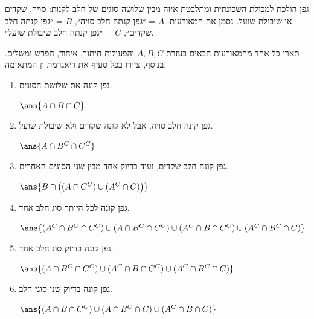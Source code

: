 גפן הולכת למכולת השכונתית ומתלבטת איזה מבין שלושה סוגים של חלב לקנות: סויה, שקדים או שיבולת שועל. נסמן את המאורעות:
$A$ = ״גפן קנתה חלב סויה״, $B$ = ״גפן קנתה חלב שקדים״, $C$ = ״גפן קנתה חלב שיבולת שועל״.

תארו כל אחד מהמאורעות הבאים בעזרת $A,B,C$ והפעולות חיתוך, איחוד, הפרש ומשלים. בנוסף, ציירו בכל סעיף את דיאגרמת ון המתאימה.
\begin{enumerate}
\item גפן קונה את שלושת הסוגים.
\begin{solbox}
$\ans{A\cap B\cap C}$

\begin{center}
\end{center}
\end{solbox}
\item גפן קונה חלב סויה, אבל לא קונה שקדים ולא שיבולת שועל.
\begin{solbox}
$\ans{A\cap B^C\cap C^C}$

\begin{center}
\end{center}
\end{solbox}
\item גפן קונה חלב שקדים, ועוד בדיוק אחד מבין שני הסוגים האחרים.
\begin{solbox}
$\ans{B\cap\big((A\cap C^C)\cup(A^C\cap C)\big)}$

\begin{center}
\end{center}
\end{solbox}
\item גפן קונה לכל היותר סוג חלב אחד.
\begin{solbox}
$\ans{(A^C\cap B^C\cap C^C)\cup(A\cap B^C\cap C^C)\cup(A^C\cap B\cap C^C)\cup(A^C\cap B^C\cap C)}$

\begin{center}
\end{center}
\end{solbox}
\item גפן קונה בדיוק סוג חלב אחד.
\begin{solbox}
$\ans{(A\cap B^C\cap C^C)\cup(A^C\cap B\cap C^C)\cup(A^C\cap B^C\cap C)}$

\begin{center}
\end{center}
\end{solbox}
\item גפן קונה בדיוק שני סוגי חלב.
\begin{solbox}
$\ans{(A\cap B\cap C^C)\cup(A\cap B^C\cap C)\cup(A^C\cap B\cap C)}$


\end{solbox}
\end{enumerate}
